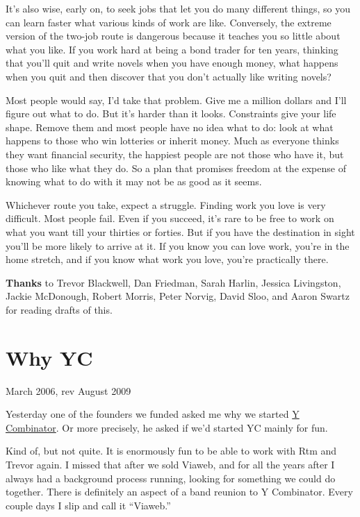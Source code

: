 \documentclass[12pt]{book}
\begin{document}
It's also wise, early on, to seek jobs that let you do many different
things, so you can learn faster what various kinds of work are like.
Conversely, the extreme version of the two-job route is dangerous
because it teaches you so little about what you like. If you work hard
at being a bond trader for ten years, thinking that you'll quit and
write novels when you have enough money, what happens when you quit and
then discover that you don't actually like writing novels?

Most people would say, I'd take that problem. Give me a million dollars
and I'll figure out what to do. But it's harder than it looks.
Constraints give your life shape. Remove them and most people have no
idea what to do: look at what happens to those who win lotteries or
inherit money. Much as everyone thinks they want financial security, the
happiest people are not those who have it, but those who like what they
do. So a plan that promises freedom at the expense of knowing what to do
with it may not be as good as it seems.

Whichever route you take, expect a struggle. Finding work you love is
very difficult. Most people fail. Even if you succeed, it's rare to be
free to work on what you want till your thirties or forties. But if you
have the destination in sight you'll be more likely to arrive at it. If
you know you can love work, you're in the home stretch, and if you know
what work you love, you're practically there.


\textbf{Thanks} to Trevor Blackwell, Dan Friedman, Sarah Harlin, Jessica
Livingston, Jackie McDonough, Robert Morris, Peter Norvig, David Sloo,
and Aaron Swartz for reading drafts of this.
\chapter{Why YC}

March 2006, rev August 2009

Yesterday one of the founders we funded asked me why we started
\href{http://ycombinator.com}{Y Combinator}. Or more precisely, he asked
if we'd started YC mainly for fun.

Kind of, but not quite. It is enormously fun to be able to work with Rtm
and Trevor again. I missed that after we sold Viaweb, and for all the
years after I always had a background process running, looking for
something we could do together. There is definitely an aspect of a band
reunion to Y Combinator. Every couple days I slip and call it
``Viaweb.''
\end{document}
